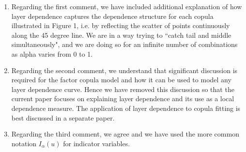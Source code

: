 \documentclass[a4paper, 12pt]{report}
\begin{document}
\begin{enumerate}

\item	Regarding the first comment, we have included additional explanation of how layer dependence captures the dependence structure for each copula illustrated in Figure 1, i.e. by reflecting the scatter of points continuously along the 45 degree line. We are in a way trying to ``catch tail and middle simultaneously", and we are doing so for an infinite number of combinations as alpha varies from 0 to 1.

\item	Regarding the second comment, we understand that significant discussion is required for the factor copula model and how it can be used to model any layer dependence curve. Hence we have removed this discussion so that the current paper focuses on explaining layer dependence and its use as a local dependence measure. The application of layer dependence to copula fitting is best discussed in a separate paper.

\item	Regarding the third comment, we agree and we have used the more common notation $I_\alpha(u)$ for indicator variables.

\end{enumerate}
\end{document}
